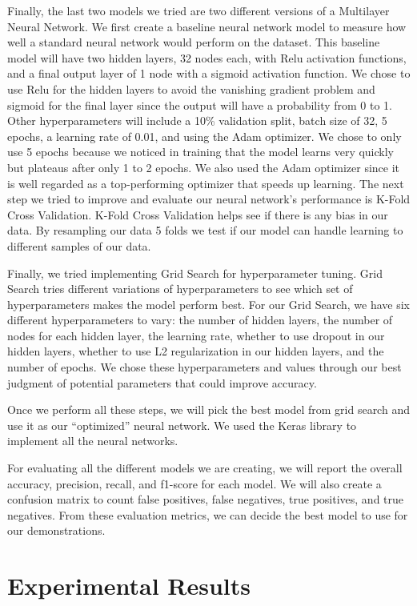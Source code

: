 \documentclass[a4paper]{article}
\begin{document}
Finally, the last two models we tried are two different versions of a Multilayer Neural Network. We first create a baseline neural network model to measure how well a standard neural network would perform on the dataset. This baseline model will have two hidden layers, 32 nodes each, with Relu activation functions, and a final output layer of 1 node with a sigmoid activation function. We chose to use Relu for the hidden layers to avoid the vanishing gradient problem and sigmoid for the final layer since the output will have a probability from 0 to 1. Other hyperparameters will include a 10\% validation split, batch size of 32, 5 epochs, a learning rate of 0.01, and using the Adam optimizer. We chose to only use 5 epochs because we noticed in training that the model learns very quickly but plateaus after only 1 to 2 epochs. We also used the Adam optimizer since it is well regarded as a top-performing optimizer that speeds up learning.
The next step we tried to improve and evaluate our neural network’s performance is K-Fold Cross Validation. K-Fold Cross Validation helps see if there is any bias in our data. By resampling our data 5 folds we test if our model can handle learning to different samples of our data.

Finally, we tried implementing Grid Search for hyperparameter tuning. Grid Search tries different variations of hyperparameters to see which set of hyperparameters makes the model perform best. For our Grid Search, we have six different hyperparameters to vary: the number of hidden layers, the number of nodes for each hidden layer, the learning rate, whether to use dropout in our hidden layers, whether to use L2 regularization in our hidden layers, and the number of epochs. We chose these hyperparameters and values through our best judgment of potential parameters that could improve accuracy. 

Once we perform all these steps, we will pick the best model from grid search and use it as our “optimized” neural network. We used the Keras library to implement all the neural networks.

For evaluating all the different models we are creating, we will report the overall accuracy, precision, recall, and f1-score for each model. We will also create a confusion matrix to count false positives, false negatives, true positives, and true negatives. From these evaluation metrics, we can decide the best model to use for our demonstrations. 


\section*{Experimental Results}
\end{document}
